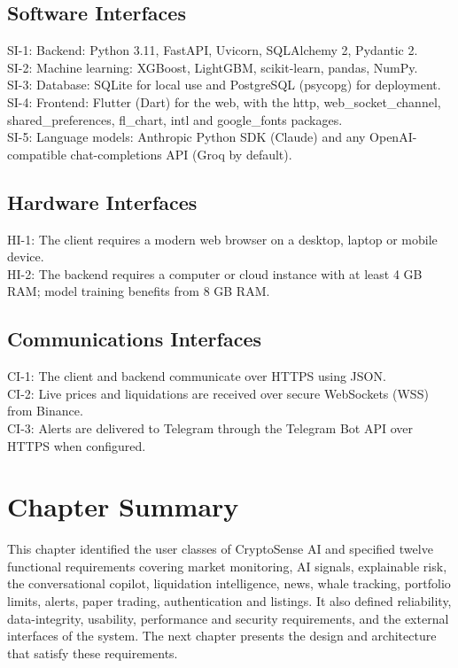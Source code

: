 \subsection{Software Interfaces}
SI-1: Backend: Python 3.11, FastAPI, Uvicorn, SQLAlchemy 2, Pydantic 2.\\
SI-2: Machine learning: XGBoost, LightGBM, scikit-learn, pandas, NumPy.\\
SI-3: Database: SQLite for local use and PostgreSQL (psycopg) for deployment.\\
SI-4: Frontend: Flutter (Dart) for the web, with the http, web\_socket\_channel, shared\_preferences, fl\_chart, intl and google\_fonts packages.\\
SI-5: Language models: Anthropic Python SDK (Claude) and any OpenAI-compatible chat-completions API (Groq by default).

\subsection{Hardware Interfaces}
HI-1: The client requires a modern web browser on a desktop, laptop or mobile device.\\
HI-2: The backend requires a computer or cloud instance with at least 4 GB RAM; model training benefits from 8 GB RAM.

\subsection{Communications Interfaces}
CI-1: The client and backend communicate over HTTPS using JSON.\\
CI-2: Live prices and liquidations are received over secure WebSockets (WSS) from Binance.\\
CI-3: Alerts are delivered to Telegram through the Telegram Bot API over HTTPS when configured.

\section{Chapter Summary}
This chapter identified the user classes of CryptoSense AI and specified twelve functional requirements covering market monitoring, AI signals, explainable risk, the conversational copilot, liquidation intelligence, news, whale tracking, portfolio limits, alerts, paper trading, authentication and listings. It also defined reliability, data-integrity, usability, performance and security requirements, and the external interfaces of the system. The next chapter presents the design and architecture that satisfy these requirements.
